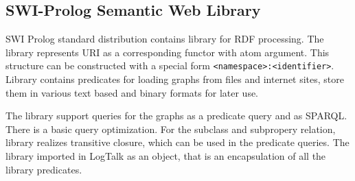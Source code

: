 \documentclass[conference]{IEEEtran} \IEEEoverridecommandlockouts
\begin{document}
\subsection{SWI-Prolog Semantic Web Library} \label{sec:swi-sw} 

SWI Prolog standard distribution contains library for RDF processing. The library represents URI as a corresponding functor with atom argument. This structure can be constructed with a special form \texttt{<namespace>:<identifier>}. Library contains predicates for loading graphs from files and internet sites, store them in various text based and binary formats for later use. 

The library support queries for the graphs as a predicate query and as SPARQL. There is a basic query optimization. For the subclass and subpropery relation, library realizes transitive closure, which can be used in the predicate queries. The library imported in LogTalk as an object, that is an encapsulation of all the library predicates. 
\end{document}
